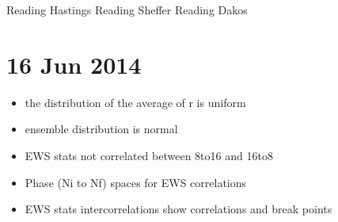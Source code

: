\documentclass[12pt]{article}
\begin{document}
Reading Hastings
Reading Sheffer
Reading Dakos

\section{16 Jun 2014}

\begin{itemize}
\item the distribution of the average of r is uniform
\item ensemble distribution is normal
\item EWS stats not correlated between 8to16 and 16to8
\item Phase (Ni to Nf) spaces for EWS correlations 
\item EWS stats intercorrelations show correlations and break points
\end{itemize}
\end{document}

